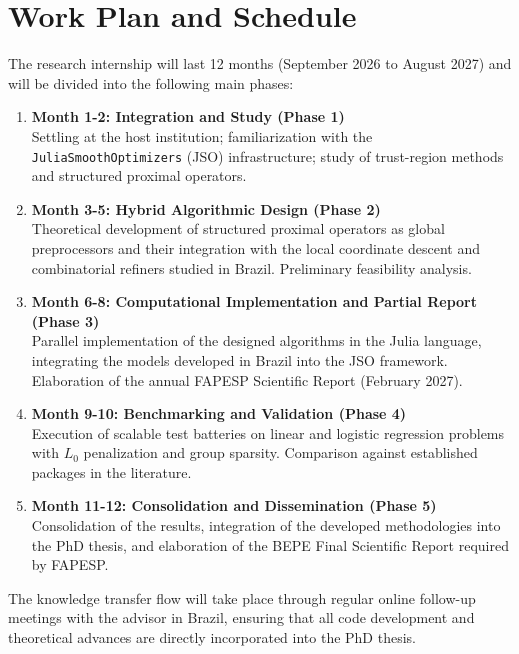 \section{Work Plan and Schedule}

The research internship will last 12 months (September 2026 to August 2027) and will be divided into the following main phases:

\begin{enumerate}
    \item \textbf{Month 1-2: Integration and Study (Phase 1)} \\
    Settling at the host institution; familiarization with the \texttt{JuliaSmoothOptimizers} (JSO) infrastructure; study of trust-region methods and structured proximal operators.
    \item \textbf{Month 3-5: Hybrid Algorithmic Design (Phase 2)} \\
    Theoretical development of structured proximal operators as global preprocessors and their integration with the local coordinate descent and combinatorial refiners studied in Brazil. Preliminary feasibility analysis.
    \item \textbf{Month 6-8: Computational Implementation and Partial Report (Phase 3)} \\
    Parallel implementation of the designed algorithms in the Julia language, integrating the models developed in Brazil into the JSO framework. Elaboration of the annual FAPESP Scientific Report (February 2027).
    \item \textbf{Month 9-10: Benchmarking and Validation (Phase 4)} \\
    Execution of scalable test batteries on linear and logistic regression problems with $L_0$ penalization and group sparsity. Comparison against established packages in the literature.
    \item \textbf{Month 11-12: Consolidation and Dissemination (Phase 5)} \\
    Consolidation of the results, integration of the developed methodologies into the PhD thesis, and elaboration of the BEPE Final Scientific Report required by FAPESP.
\end{enumerate}

The knowledge transfer flow will take place through regular online follow-up meetings with the advisor in Brazil, ensuring that all code development and theoretical advances are directly incorporated into the PhD thesis.
